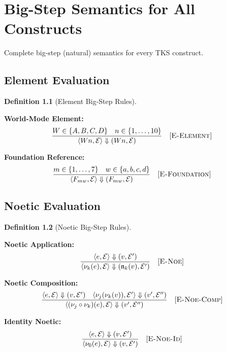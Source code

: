 \documentclass[11pt,twoside,openright]{book}
\theoremstyle{definition}
\newtheorem{definition}{Definition}[chapter]
\theoremstyle{plain}
\theoremstyle{remark}
\newcommand{\noe}[1]{\nu_{#1}}
\newcommand{\bigstep}{\Downarrow}
\newcommand{\vnew}{\textcolor{blue!70!black}{\textbf{[NEW v7.0]}}}
\begin{document}
\chapter{Big-Step Semantics for All Constructs}
\label{ch:bigstep}

\begin{tcolorbox}[colback=blue!5!white,colframe=blue!75!black,title=\vnew]
Complete big-step (natural) semantics for every TKS construct.
\end{tcolorbox}

\section{Element Evaluation}

\begin{definition}[Element Big-Step Rules]
\label{def:element-bigstep}

\textbf{World-Mode Element:}
\[
\frac{W \in \{A, B, C, D\} \quad n \in \{1, \ldots, 10\}}
{\langle Wn, \mathcal{E} \rangle \bigstep (Wn, \mathcal{E})} \quad [\textsc{E-Element}]
\]

\textbf{Foundation Reference:}
\[
\frac{m \in \{1, \ldots, 7\} \quad w \in \{a, b, c, d\}}
{\langle F_{mw}, \mathcal{E} \rangle \bigstep (F_{mw}, \mathcal{E})} \quad [\textsc{E-Foundation}]
\]
\end{definition}

\section{Noetic Evaluation}

\begin{definition}[Noetic Big-Step Rules]
\label{def:noetic-bigstep}

\textbf{Noetic Application:}
\[
\frac{\langle e, \mathcal{E} \rangle \bigstep (v, \mathcal{E}')}
{\langle \noe{k}(e), \mathcal{E} \rangle \bigstep (\mathfrak{n}_k(v), \mathcal{E}')} \quad [\textsc{E-Noe}]
\]

\textbf{Noetic Composition:}
\[
\frac{\langle e, \mathcal{E} \rangle \bigstep (v, \mathcal{E}') \quad \langle \noe{j}(\noe{k}(v)), \mathcal{E}' \rangle \bigstep (v', \mathcal{E}'')}
{\langle (\noe{j} \circ \noe{k})(e), \mathcal{E} \rangle \bigstep (v', \mathcal{E}'')} \quad [\textsc{E-Noe-Comp}]
\]

\textbf{Identity Noetic:}
\[
\frac{\langle e, \mathcal{E} \rangle \bigstep (v, \mathcal{E}')}
{\langle \noe{0}(e), \mathcal{E} \rangle \bigstep (v, \mathcal{E}')} \quad [\textsc{E-Noe-Id}]
\]
\end{definition}
\end{document}

